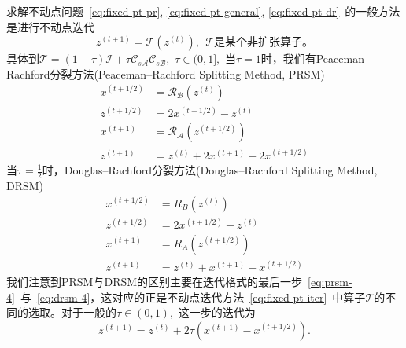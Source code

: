 求解不动点问题~\eqref{eq:fixed-pt-pr}, \eqref{eq:fixed-pt-general}, \eqref{eq:fixed-pt-dr}~的一般方法是进行不动点迭代
\begin{equation}
\label{eq:fixed-pt-iter}
z^{(t+1)} = \mathcal{T}(z^{(t)}), ~~ \text{$\mathcal{T}$是某个非扩张算子。}
\end{equation}
具体到$\mathcal{T} = (1 - \tau) \mathcal{I} + \tau \mathcal{C}_{s\mathcal{A}} \mathcal{C}_{s\mathcal{B}},$ $\tau \in (0, 1],$ 当$\tau = 1$时，我们有Peaceman–Rachford分裂方法(Peaceman–Rachford Splitting Method, PRSM)
\begin{subequations}
\label{eq:prsm}
\begin{align}
x^{(t+1/2)} & = \mathcal{R}_{\mathcal{B}}(z^{(t)}) \label{eq:prsm-1} \\
z^{(t+1/2)} & = 2x^{(t+1/2)} - z^{(t)} \label{eq:prsm-2} \\
x^{(t+1)} & = \mathcal{R}_{\mathcal{A}}(z^{(t+1/2)}) \label{eq:prsm-3} \\
z^{(t+1)} & = z^{(t)} + 2x^{(t+1)} - 2x^{(t+1/2)} \label{eq:prsm-4}
\end{align}
\end{subequations}
当$\tau = \frac{1}{2}$时，Douglas–Rachford分裂方法(Douglas–Rachford Splitting Method, DRSM)
\begin{subequations}
\label{eq:drsm}
\begin{align}
x^{(t+1/2)} & = R_B(z^{(t)}) \label{eq:drsm-1} \\
z^{(t+1/2)} & = 2x^{(t+1/2)} - z^{(t)} \label{eq:drsm-2} \\
x^{(t+1)} & = R_A(z^{(t+1/2)}) \label{eq:drsm-3} \\
z^{(t+1)} & = z^{(t)} + x^{(t+1)} - x^{(t+1/2)} \label{eq:drsm-4}
\end{align}
\end{subequations}
我们注意到PRSM与DRSM的区别主要在迭代格式的最后一步~\eqref{eq:prsm-4}~与~\eqref{eq:drsm-4}，这对应的正是不动点迭代方法~\eqref{eq:fixed-pt-iter}~中算子$\mathcal{T}$的不同的选取。对于一般的$\tau \in (0, 1),$ 这一步的迭代为
\begin{equation}
\label{eq:sm-general-step}
z^{(t+1)} = z^{(t)} + 2\tau (x^{(t+1)} - x^{(t+1/2)}).
\end{equation}

